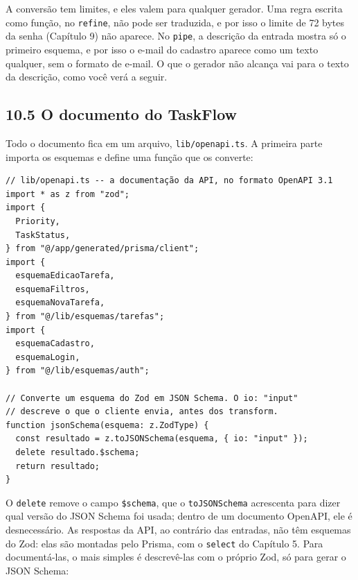 A conversão tem limites, e eles valem para qualquer gerador. Uma regra escrita como função, no \texttt{refine}, não pode ser traduzida, e por isso o limite de 72 bytes da senha (Capítulo 9) não aparece. No \texttt{pipe}, a descrição da entrada mostra só o primeiro esquema, e por isso o e-mail do cadastro aparece como um texto qualquer, sem o formato de e-mail. O que o gerador não alcança vai para o texto da descrição, como você verá a seguir.

\subsection{10.5 O documento do TaskFlow}

Todo o documento fica em um arquivo, \texttt{lib/openapi.ts}. A primeira parte importa os esquemas e define uma função que os converte:

\begin{codigo}
\begin{Verbatim}[breaklines=true, breaksymbolleft={}, fontsize=\footnotesize]
// lib/openapi.ts -- a documentação da API, no formato OpenAPI 3.1
import * as z from "zod";
import {
  Priority,
  TaskStatus,
} from "@/app/generated/prisma/client";
import {
  esquemaEdicaoTarefa,
  esquemaFiltros,
  esquemaNovaTarefa,
} from "@/lib/esquemas/tarefas";
import {
  esquemaCadastro,
  esquemaLogin,
} from "@/lib/esquemas/auth";

// Converte um esquema do Zod em JSON Schema. O io: "input"
// descreve o que o cliente envia, antes dos transform.
function jsonSchema(esquema: z.ZodType) {
  const resultado = z.toJSONSchema(esquema, { io: "input" });
  delete resultado.$schema;
  return resultado;
}
\end{Verbatim}
\end{codigo}

O \texttt{delete} remove o campo \texttt{\$schema}, que o \texttt{toJSONSchema} acrescenta para dizer qual versão do JSON Schema foi usada; dentro de um documento OpenAPI, ele é desnecessário. As respostas da API, ao contrário das entradas, não têm esquemas do Zod: elas são montadas pelo Prisma, com o \texttt{select} do Capítulo 5. Para documentá-las, o mais simples é descrevê-las com o próprio Zod, só para gerar o JSON Schema:

